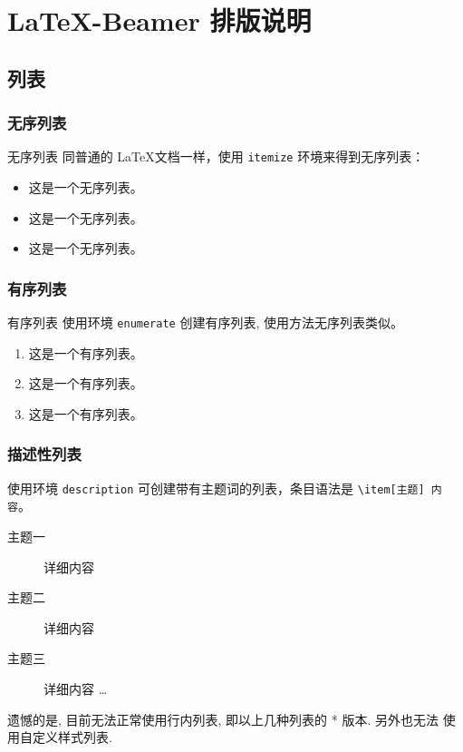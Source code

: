 \section{\LaTeX-Beamer 排版说明}
\subsection{列表}
\subsubsection{无序列表}
\begin{frame}{无序列表}
同普通的 \LaTeX 文档一样，使用 \lstinline{itemize} 环境来得到无序列表：
\begin{itemize}
  \item 这是一个无序列表。
  \item 这是一个无序列表。
  \item 这是一个无序列表。
\end{itemize}
\end{frame}


\subsubsection{有序列表}
\begin{frame}{有序列表}
使用环境 \lstinline{enumerate} 创建有序列表, 使用方法无序列表类似。

\begin{enumerate}
  \item 这是一个有序列表。
  \item 这是一个有序列表。
  \item 这是一个有序列表。
\end{enumerate}

\end{frame}

\subsubsection{描述性列表}
\begin{frame}
使用环境 \lstinline{description} 可创建带有主题词的列表，条目语法是 
\lstinline{\item[主题] 内容}。
\begin{description}
    \item[主题一] 详细内容
    \item[主题二] 详细内容
    \item[主题三] 详细内容 \ldots
\end{description}
遗憾的是, 目前无法正常使用行内列表, 即以上几种列表的 * 版本. 另外也无法
使用自定义样式列表.

\end{frame}

